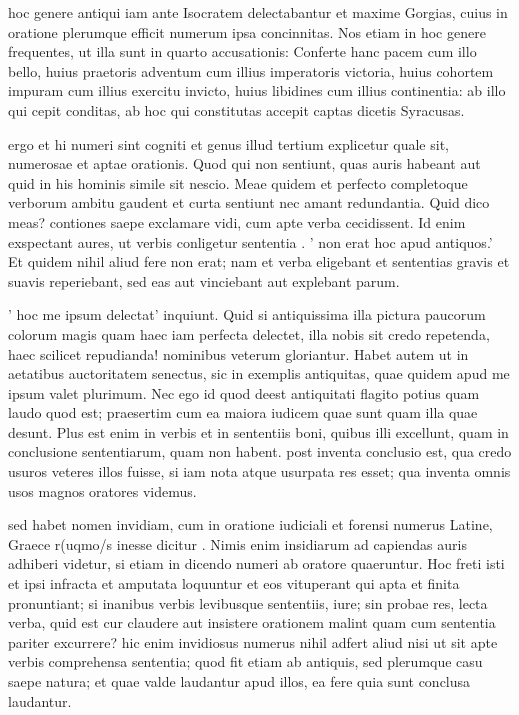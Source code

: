  hoc genere antiqui iam ante Isocratem delectabantur et maxime Gorgias, cuius in oratione plerumque efficit numerum ipsa concinnitas. Nos etiam in hoc genere frequentes, ut illa sunt in quarto accusationis: Conferte hanc pacem cum illo bello, huius praetoris adventum cum illius imperatoris victoria, huius cohortem impuram cum illius exercitu invicto, huius libidines cum illius continentia: ab illo qui cepit conditas, ab hoc qui constitutas accepit captas dicetis Syracusas.

 ergo et hi numeri sint cogniti et genus illud tertium explicetur quale sit, numerosae et aptae orationis. Quod qui non sentiunt, quas auris habeant aut quid in his hominis simile sit nescio. Meae quidem et perfecto completoque verborum ambitu gaudent et curta sentiunt nec amant redundantia. Quid dico meas? contiones saepe exclamare vidi, cum apte verba cecidissent. Id enim exspectant aures, ut verbis conligetur sententia . ' non erat hoc apud antiquos.' Et quidem nihil aliud fere non erat; nam et verba eligebant et sententias gravis et suavis reperiebant, sed eas aut vinciebant aut explebant parum.

 ' hoc me ipsum delectat' inquiunt. Quid si antiquissima illa pictura paucorum colorum magis quam haec iam perfecta delectet, illa nobis sit credo repetenda, haec scilicet repudianda! nominibus veterum gloriantur. Habet autem ut in aetatibus auctoritatem senectus, sic in exemplis antiquitas, quae quidem apud me ipsum valet plurimum. Nec ego id quod deest antiquitati flagito potius quam laudo quod est; praesertim cum ea maiora iudicem quae sunt quam illa quae desunt. Plus est enim in verbis et in sententiis boni, quibus illi excellunt, quam in conclusione sententiarum, quam non habent. post inventa conclusio est, qua credo usuros veteres illos fuisse, si iam nota atque usurpata res esset; qua inventa omnis usos magnos oratores videmus.

 sed habet nomen invidiam, cum in oratione iudiciali et forensi numerus Latine, Graece r(uqmo/s inesse dicitur . Nimis enim insidiarum ad capiendas auris adhiberi videtur, si etiam in dicendo numeri ab oratore quaeruntur. Hoc freti isti et ipsi infracta et amputata loquuntur et eos vituperant qui apta et finita pronuntiant; si inanibus verbis levibusque sententiis, iure; sin probae res, lecta verba, quid est cur claudere aut insistere orationem malint quam cum sententia pariter excurrere? hic enim invidiosus numerus nihil adfert aliud nisi ut sit apte verbis comprehensa sententia; quod fit etiam ab antiquis, sed plerumque casu saepe natura; et quae valde laudantur apud illos, ea fere quia sunt conclusa laudantur.

